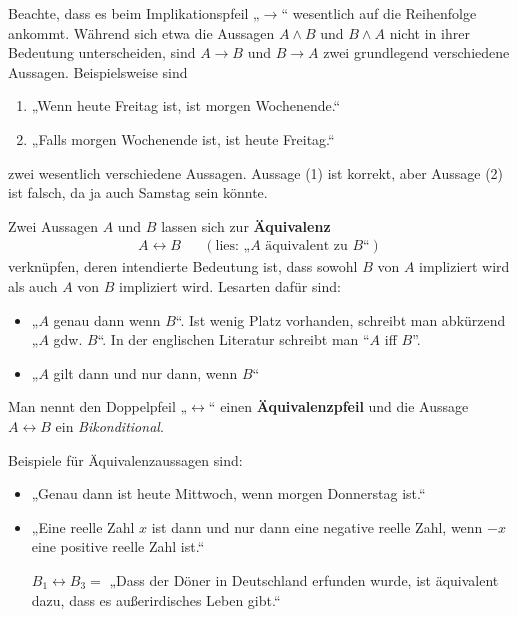 \begin{bem}
    Beachte, dass es beim Implikationspfeil „$\to$“ wesentlich auf die Reihenfolge ankommt. Während sich etwa die Aussagen $A\land B$ und $B\land A$ nicht in ihrer Bedeutung unterscheiden, sind $A\to B$ und $B\to A$ zwei grundlegend verschiedene Aussagen. Beispielsweise sind
    \begin{enumerate}[(1)]
        \item „Wenn heute Freitag ist, ist morgen Wochenende.“
        \item „Falls morgen Wochenende ist, ist heute Freitag.“
    \end{enumerate}
    zwei wesentlich verschiedene Aussagen. Aussage (1) ist korrekt, aber Aussage (2) ist falsch, da ja auch Samstag sein könnte.
\end{bem}


\begin{defin}[Äquivalenz] 
    Zwei Aussagen $A$ und $B$ lassen sich zur \textbf{Äquivalenz}
    \begin{align*}
        A\leftrightarrow B  && (\text{lies: „$A$ äquivalent zu $B$“})
    \end{align*}
    verknüpfen, deren intendierte Bedeutung ist, dass sowohl $B$ von $A$ impliziert wird als auch $A$ von $B$ impliziert wird. Lesarten dafür sind:
    \begin{itemize}
        \item „$A$ genau dann wenn $B$“. Ist wenig Platz vorhanden, schreibt man abkürzend „$A$ gdw. $B$“. In der englischen Literatur schreibt man ``$A$ iff $B$''.
        \item „$A$ gilt dann und nur dann, wenn $B$“
    \end{itemize}
    Man nennt den Doppelpfeil „$\leftrightarrow$“ einen \textbf{Äquivalenzpfeil} und die Aussage $A\leftrightarrow B$ ein \emph{Bikonditional}.
\end{defin}

    
\begin{bsp}
    Beispiele für Äquivalenzaussagen sind:
    \begin{itemize}[labelindent=5.5em, labelwidth=, leftmargin=*]
        \item „Genau dann ist heute Mittwoch, wenn morgen Donnerstag ist.“
        \item „Eine reelle Zahl $x$ ist dann und nur dann eine negative reelle Zahl, wenn $-x$ eine positive reelle Zahl ist.“
        \item[$B_1\leftrightarrow B_3=$] „Dass der Döner in Deutschland erfunden wurde, ist äquivalent dazu, dass es außerirdisches Leben gibt.“
    \end{itemize}
\end{bsp}

